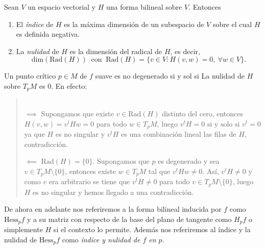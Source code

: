 \begin{definition}
    Sean $V$ un espacio vectorial y $H$ una forma bilineal sobre $V$. Entonces
    
    \begin{enumerate}[label=\roman*)]
        \item El \textit{índice} de $H$ es la máxima dimensión de un subespacio de $V$ sobre el cual $H$ es definida negativa.
        
        \item La \textit{nulidad} de $H$ es la dimensión del radical de $H$, es decir,
        \begin{equation*}
            \text{dim}(\text{Rad}(H)) ~\text{ con }~ \text{Rad}(H)=\{v\in V:H(v,w)=0, ~\forall w\in V \}.
        \end{equation*}
        
    \end{enumerate}
\end{definition}

\begin{remark}
    Un punto crítico $p\in M$ de $f$ suave es no degenerado si y sol si La nulidad de $H$ sobre $T_pM$ es $0$. En efecto:
    \vspace{-2em}
    \begin{quote}
        \mbox{}\\[0.5em]
        $\boxed{\implies}$ Supongamos que existe $v\in \text{Rad}(H)$ distinto del cero, entonces $H(v,w)=v^tHw=0$ para todo $w\in T_pM$, luego $v^tH=0 \text{ si y solo si } v^t = 0$ ya que $H$ es no singular y $v^tH$ es una combinación lineal las filas de $H$, contradicción.

        $\boxed{\impliedby}$ $\text{Rad}(H)=\{0\}$. Supongamos que $p$ es degenerado y sea $v\in T_pM\setminus\{0\}$, entonces existe $w\in T_pM$ tal que $v^tHw\neq 0$. Así, $v^tH\neq 0$ y como $v$ era arbitrario se tiene que $v^tH\neq 0$ para todo $v\in T_pM\setminus\{0\}$, luego $H$ es no singular y hemos llegado a una contradicción.
    \end{quote}
\end{remark}
\bigskip

\begin{nota}
    De ahora en adelante nos referiremos a la forma bilineal inducida por $f$ como $\text{Hess}_pf$ y a su matriz con respecto de la base del plano de tangente como $H_pf$ o simplemente $H$ si el contexto lo permite. Además nos referiremos al índice y la nulidad de $\text{Hess}_pf$ como \textit{índice y nulidad de $f$ en $p$}.
\end{nota}
\bigskip


